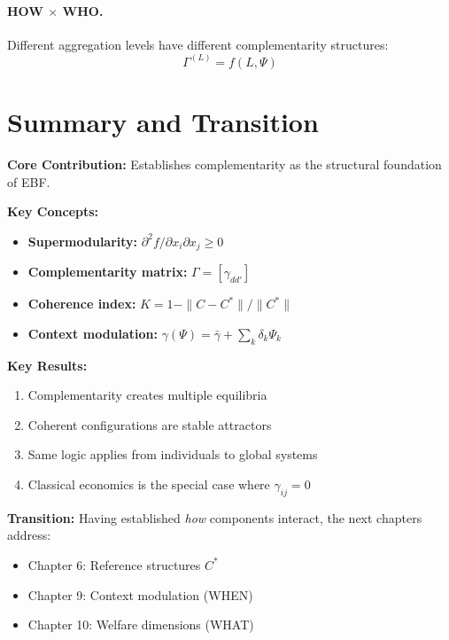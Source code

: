 \paragraph{HOW $\times$ WHO.}
Different aggregation levels have different complementarity structures:
\begin{equation}
\Gamma^{(L)} = f(L, \Psi)
\end{equation}



\section{Summary and Transition}
\label{sec:comp-summary}


\begin{tcolorbox}[
    colback=blue!5!white,
    colframe=blue!75!black,
    title={\textbf{Chapter 5 Summary: Complementarity (CORE-HOW)}}
]
\textbf{Core Contribution:}
Establishes complementarity as the structural foundation of EBF.

\textbf{Key Concepts:}
\begin{itemize}[nosep]
    \item \textbf{Supermodularity:} $\partial^2 f / \partial x_i \partial x_j \geq 0$
    \item \textbf{Complementarity matrix:} $\Gamma = [\gamma_{dd'}]$
    \item \textbf{Coherence index:} $K = 1 - \|C - C^*\| / \|C^*\|$
    \item \textbf{Context modulation:} $\gamma(\Psi) = \bar{\gamma} + \sum_k \delta_k \Psi_k$
\end{itemize}

\textbf{Key Results:}
\begin{enumerate}[nosep]
    \item Complementarity creates multiple equilibria
    \item Coherent configurations are stable attractors
    \item Same logic applies from individuals to global systems
    \item Classical economics is the special case where $\gamma_{ij} = 0$
\end{enumerate}

\textbf{Transition:}
Having established \emph{how} components interact, the next chapters address:
\begin{itemize}[nosep]
    \item Chapter 6: Reference structures $C^*$
    \item Chapter 9: Context modulation (WHEN)
    \item Chapter 10: Welfare dimensions (WHAT)
\end{itemize}
\end{tcolorbox}

